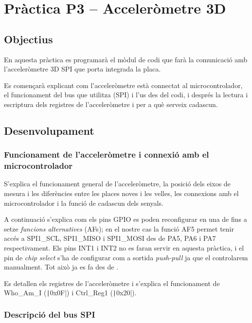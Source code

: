 \chapter{\label{ch:p3} Pràctica P3 -- Acceleròmetre 3D}

\section{Objectius}

En aquesta pràctica es programarà el mòdul de codi que farà la comunicació
amb l'acceleròmetre 3D SPI que porta integrada la placa.

Es començarà explicant com l'acceleròmetre està connectat al microcontrolador,
el funcionament del bus que utilitza (SPI) i l'us des del codi, i després
la lectura i escriptura dels registres de l'acceleròmetre i per a què serveix
cadascun.

\section{Desenvolupament}


\subsection{Funcionament de l’acceleròmetre i connexió amb el microcontrolador}

S'explica el funcionament general de l'acceleròmetre, la posició dels eixos de mesura
i les diferències entre les places noves i les velles, les connexions amb el
microcontrolador i la funció de cadascun dels senyals.

A continuació s'explica com els pins GPIO es poden reconfigurar en una de fins a setze
\emph{funcions alternatives} (AFs); en el nostre cas la funció AF5 permet tenir accés a
\textsf{SPI1\_SCL}, \textsf{SPI1\_MISO} i \textsf{SPI1\_MOSI} des de \textsf{PA5}, \textsf{PA6}
i \textsf{PA7} respectivament. Els pins \textsf{INT1} i \textsf{INT2} no es faran servir
en aquesta pràctica, i el pin de \emph{chip select} s'ha de configurar com a sortida \emph{push-pull}
ja que el controlarem manualment. Tot això ja es fa des de .

Es detallen els registres de l'acceleròmetre i s'explica el funcionament de \textsf{Who\_Am\_I}
(\texttt|0x0F|) i \textsf{Ctrl\_Reg1} (\texttt|0x20|).

\subsection{Descripció del bus SPI}


